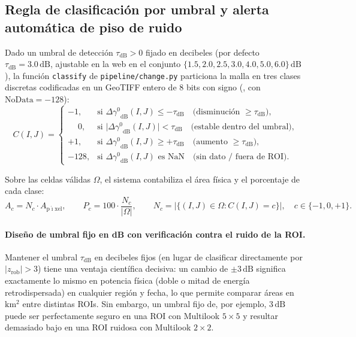 \documentclass[11pt,a4paper]{article}
\newcommand{\src}[1]{\nolinkurl{#1}}
\newcommand{\unit}[1]{\mathrm{#1}}
\newcommand{\gz}{\ensuremath{\gamma^{0}}}
\begin{document}
\subsection{Regla de clasificación por umbral y alerta automática de piso de ruido}
\label{subsec:cambio-clasificacion-ruido}

Dado un umbral de detección $\tau_{\mathrm{dB}} > 0$ fijado en decibeles (por defecto $\tau_{\mathrm{dB}} =
3.0\,\unit{dB}$, ajustable en la web en el conjunto $\{1.5, 2.0, 2.5, 3.0, 4.0, 5.0, 6.0\}\,\unit{dB}$), la
función \texttt{classify} de \src{pipeline/change.py} particiona la malla en tres clases discretas codificadas
en un GeoTIFF entero de 8 bits con signo (, con $\text{NoData} = -128$):
\begin{equation}
  C(I,J) =
  \begin{cases}
    -1, & \text{si } \Delta\gz_{\mathrm{dB}}(I,J) \le -\tau_{\mathrm{dB}} \quad\text{(disminución $\ge \tau_{\mathrm{dB}}$)}, \\[4pt]
    \phantom{-}0, & \text{si } \bigl|\Delta\gz_{\mathrm{dB}}(I,J)\bigr| < \tau_{\mathrm{dB}} \quad\text{(estable dentro del umbral)}, \\[4pt]
    +1, & \text{si } \Delta\gz_{\mathrm{dB}}(I,J) \ge +\tau_{\mathrm{dB}} \quad\text{(aumento $\ge \tau_{\mathrm{dB}}$)}, \\[4pt]
    -128, & \text{si } \Delta\gz_{\mathrm{dB}}(I,J) \text{ es } \mathrm{NaN} \quad\text{(sin dato / fuera de ROI)}.
  \end{cases}
  \label{eq:cambio-clases}
\end{equation}

Sobre las celdas válidas $\Omega$, el sistema contabiliza el área física y el porcentaje de cada clase:
\begin{equation}
  A_{c} = N_{c} \cdot A_{\mathrm{p\acute{\imath}xel}}, \qquad
  P_{c} = 100 \cdot \frac{N_{c}}{|\Omega|}, \qquad
  N_{c} = \bigl|\{(I,J)\in\Omega : C(I,J) = c\}\bigr|, \quad c \in \{-1, 0, +1\}.
  \label{eq:cambio-areas}
\end{equation}

\paragraph{Diseño de umbral fijo en dB con verificación contra el ruido de la ROI.}
Mantener el umbral $\tau_{\mathrm{dB}}$ en decibeles fijos (en lugar de clasificar directamente por
$|z_{\mathrm{rob}}| > 3$) tiene una ventaja científica decisiva: un cambio de $\pm 3\,\unit{dB}$ significa
exactamente lo mismo en potencia física (doble o mitad de energía retrodispersada) en cualquier región y fecha,
lo que permite comparar áreas en $\unit{km^2}$ entre distintas ROIs. Sin embargo, un umbral fijo de, por
ejemplo, $3\,\unit{dB}$ puede ser perfectamente seguro en una ROI con Multilook $5\times 5$ y resultar demasiado
bajo en una ROI ruidosa con Multilook $2\times 2$.
\end{document}
